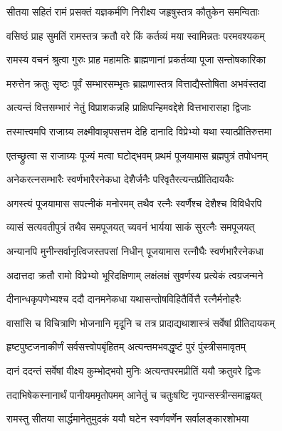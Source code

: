 \twolineshloka
{सीतया सहितं रामं प्रसक्तं यज्ञकर्मणि}
{निरीक्ष्य जहृषुस्तत्र कौतुकेन समन्विताः}%

\twolineshloka
{वसिष्ठं प्राह सुमतिं रामस्तत्र क्रतौ वरे}
{किं कर्तव्यं मया स्वामिन्नतः परमवश्यकम्}%

\twolineshloka
{रामस्य वचनं श्रुत्वा गुरुः प्राह महामतिः}
{ब्राह्मणानां प्रकर्तव्या पूजा सन्तोषकारिका}%

\twolineshloka
{मरुत्तेन क्रतुः सृष्टः पूर्वं सम्भारसम्भृतः}
{ब्राह्मणास्तत्र वित्ताद्यैस्तोषिता अभवंस्तदा}%

\twolineshloka
{अत्यन्तं वित्तसम्भारं नेतुं विप्राशकन्नहि}
{प्राक्षिपन्हिमवद्देशे वित्तभारासहा द्विजाः}%

\twolineshloka
{तस्मात्त्वमपि राजाग्र्य लक्ष्मीवान्नृपसत्तम}
{देहि दानादि विप्रेभ्यो यथा स्यात्प्रीतिरुत्तमा}%

\twolineshloka
{एतच्छ्रुत्वा स राजाग्र्यः पूज्यं मत्वा घटोद्भवम्}
{प्रथमं पूजयामास ब्रह्मपुत्रं तपोधनम्}%

\twolineshloka
{अनेकरत्नसम्भारैः स्वर्णभारैरनेकधा}
{देशैर्जनैः परिवृतैरत्यन्तप्रीतिदायकैः}%

\twolineshloka
{अगस्त्यं पूजयामास सपत्नीकं मनोरमम्}
{तथैव रत्नैः स्वर्णैश्च देशैश्च विविधैरपि}%

\twolineshloka
{व्यासं सत्यवतीपुत्रं तथैव समपूजयत्}
{च्यवनं भार्यया साकं सुरत्नैः समपूजयत्}%

\twolineshloka
{अन्यानपि मुनीन्सर्वानृत्विजस्तपसां निधीन्}
{पूजयामास रत्नौघैः स्वर्णभारैरनेकधा}%

\twolineshloka
{अदात्तदा क्रतौ रामो विप्रेभ्यो भूरिदक्षिणाम्}
{लक्षंलक्षं सुवर्णस्य प्रत्येकं त्वग्रजन्मने}%

\twolineshloka
{दीनान्धकृपणेभ्यश्च ददौ दानमनेकधा}
{यथासन्तोषविहितैर्वित्तै रत्नैर्मनोहरैः}%

\twolineshloka
{वासांसि च विचित्राणि भोजनानि मृदूनि च}
{तत्र प्रादाद्यथाशास्त्रं सर्वेषां प्रीतिदायकम्}%

\twolineshloka
{हृष्टपुष्टजनाकीर्णं सर्वसत्त्वोपबृंहितम्}
{अत्यन्तमभवद्धृष्टं पुरं पुंस्त्रीसमावृतम्}%

\twolineshloka
{दानं ददन्तं सर्वेषां वीक्ष्य कुम्भोद्भवो मुनिः}
{अत्यन्तपरमप्रीतिं ययौ क्रतुवरे द्विजः}%

\twolineshloka
{तदाभिषेकस्नानार्थं पानीयममृतोपमम्}
{आनेतुं च चतुःषष्टि नृपान्सस्त्रीन्समाह्वयत्}%

\twolineshloka
{रामस्तु सीतया सार्द्धमानेतुमुदकं ययौ}
{घटेन स्वर्णवर्णेन सर्वालङ्कारशोभया}%

